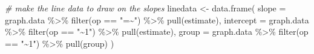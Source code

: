 \documentclass[
  man]{apa7}
\newenvironment{Shaded}{\begin{snugshade}}{\end{snugshade}}
\newcommand{\AttributeTok}[1]{\textcolor[rgb]{0.77,0.63,0.00}{#1}}
\newcommand{\CommentTok}[1]{\textcolor[rgb]{0.56,0.35,0.01}{\textit{#1}}}
\newcommand{\FunctionTok}[1]{\textcolor[rgb]{0.00,0.00,0.00}{#1}}
\newcommand{\NormalTok}[1]{#1}
\newcommand{\OtherTok}[1]{\textcolor[rgb]{0.56,0.35,0.01}{#1}}
\newcommand{\SpecialCharTok}[1]{\textcolor[rgb]{0.00,0.00,0.00}{#1}}
\newcommand{\StringTok}[1]{\textcolor[rgb]{0.31,0.60,0.02}{#1}}
\begin{document}
\begin{Shaded}
\begin{Highlighting}[]
  \CommentTok{\# make the line data to draw on the slopes}
\NormalTok{  linedata }\OtherTok{\textless{}{-}} \FunctionTok{data.frame}\NormalTok{(}
  \AttributeTok{slope =}\NormalTok{ graph.data }\SpecialCharTok{\%\textgreater{}\%} \FunctionTok{filter}\NormalTok{(op }\SpecialCharTok{==} \StringTok{"=\textasciitilde{}"}\NormalTok{) }\SpecialCharTok{\%\textgreater{}\%} \FunctionTok{pull}\NormalTok{(estimate), }
  \AttributeTok{intercept =}\NormalTok{ graph.data }\SpecialCharTok{\%\textgreater{}\%} \FunctionTok{filter}\NormalTok{(op }\SpecialCharTok{==} \StringTok{"\textasciitilde{}1"}\NormalTok{) }\SpecialCharTok{\%\textgreater{}\%} \FunctionTok{pull}\NormalTok{(estimate), }
  \AttributeTok{group =}\NormalTok{ graph.data }\SpecialCharTok{\%\textgreater{}\%} \FunctionTok{filter}\NormalTok{(op }\SpecialCharTok{==} \StringTok{"\textasciitilde{}1"}\NormalTok{) }\SpecialCharTok{\%\textgreater{}\%} \FunctionTok{pull}\NormalTok{(group)}
\NormalTok{  )}
  

\end{Highlighting}
\end{Shaded}
\end{document}
